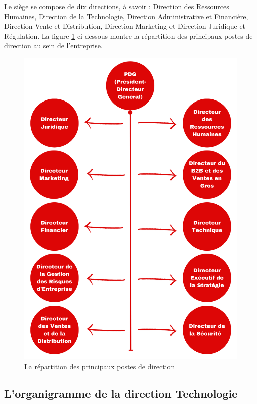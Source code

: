  Le siège se compose de dix directions, à savoir : Direction des Ressources Humaines, Direction de la Technologie, Direction Administrative et Financière, Direction Vente et Distribution, Direction Marketing et Direction Juridique et Régulation.
 La figure \ref{Hier} ci-dessous montre la répartition des principaux postes de direction au sein de l'entreprise.
\begin{figure}[H]
    \centering
    \includegraphics[width=0.5\linewidth]{General_Ooredoo.png}
    \caption{La répartition des principaux postes de direction}
    \label{Hier}
\end{figure}

\subsection{L’organigramme de la direction Technologie }

